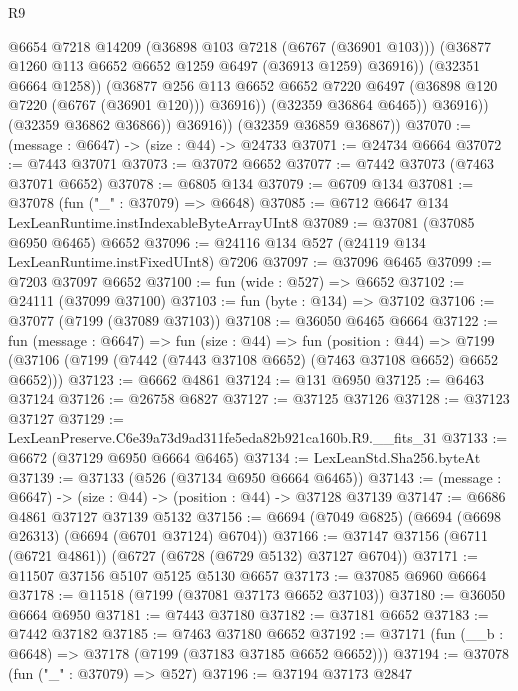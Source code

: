 \begin{lexlean}{R9}
\begin{coremodule}
                        @6654
                        @7218
                        @14209
                        (@36898 @103 @7218 (@6767 (@36901 @103)))
                        (@36877 @1260 @113 @6652 @6652 @1259 @6497 (@36913 @1259) @36916))
                      (@32351 @6664 @1258))
                    (@36877
                      @256
                      @113
                      @6652
                      @6652
                      @7220
                      @6497
                      (@36898 @120 @7220 (@6767 (@36901 @120)))
                      @36916))
                  (@32359 @36864 @6465))
                @36916))
            (@32359 @36862 @36866))
          @36916))
      (@32359 @36859 @36867))
@37070 := (message : @6647) -> (size : @44) -> @24733
@37071 := @24734 @6664
@37072 := @7443 @37071
@37073 := @37072 @6652
@37077 := @7442 @37073 (@7463 @37071 @6652)
@37078 := @6805 @134
@37079 := @6709 @134
@37081 := @37078 (fun ("_" : @37079) => @6648)
@37085 := @6712 @6647 @134 LexLeanRuntime.instIndexableByteArrayUInt8
@37089 := @37081 (@37085 @6950 @6465) @6652
@37096 := @24116 @134 @527 (@24119 @134 LexLeanRuntime.instFixedUInt8) @7206
@37097 := @37096 @6465
@37099 := @7203 @37097 @6652
@37100 := fun (wide : @527) => @6652
@37102 := @24111 (@37099 @37100)
@37103 := fun (byte : @134) => @37102
@37106 := @37077 (@7199 (@37089 @37103))
@37108 := @36050 @6465 @6664
@37122 := fun (message : @6647) =>
  fun (size : @44) =>
  fun (position : @44) =>
  @7199 (@37106 (@7199 (@7442 (@7443 @37108 @6652) (@7463 @37108 @6652) @6652 @6652)))
@37123 := @6662 @4861
@37124 := @131 @6950
@37125 := @6463 @37124
@37126 := @26758 @6827
@37127 := @37125 @37126
@37128 := @37123 @37127
@37129 := LexLeanPreserve.C6e39a73d9ad311fe5eda82b921ca160b.R9.__fits_31
@37133 := @6672 (@37129 @6950 @6664 @6465)
@37134 := LexLeanStd.Sha256.byteAt
@37139 := @37133 (@526 (@37134 @6950 @6664 @6465))
@37143 := (message : @6647) -> (size : @44) -> (position : @44) -> @37128 @37139
@37147 := @6686 @4861 @37127 @37139 @5132
@37156 := @6694 (@7049 @6825) (@6694 (@6698 @26313) (@6694 (@6701 @37124) @6704))
@37166 := @37147 @37156 (@6711 (@6721 @4861)) (@6727 (@6728 (@6729 @5132) @37127 @6704))
@37171 := @11507 @37156 @5107 @5125 @5130 @6657
@37173 := @37085 @6960 @6664
@37178 := @11518 (@7199 (@37081 @37173 @6652 @37103))
@37180 := @36050 @6664 @6950
@37181 := @7443 @37180
@37182 := @37181 @6652
@37183 := @7442 @37182
@37185 := @7463 @37180 @6652
@37192 := @37171 (fun (__b : @6648) => @37178 (@7199 (@37183 @37185 @6652 @6652)))
@37194 := @37078 (fun ("_" : @37079) => @527)
@37196 := @37194 @37173 @2847

\end{coremodule}
\end{lexlean}
